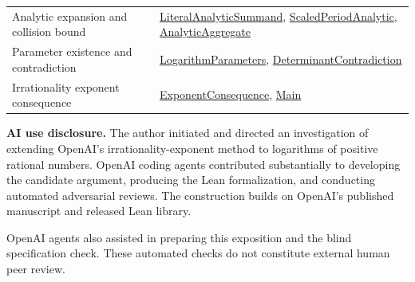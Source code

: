 \begin{longtable}{@{}>{\raggedright\arraybackslash}p{}>{\raggedright\arraybackslash}p{}@{}}
Analytic expansion and collision bound & \href{run:lean/Logarithm/LiteralAnalyticSummand.lean}{LiteralAnalyticSummand}, \href{run:lean/Logarithm/ScaledPeriodAnalytic.lean}{ScaledPeriodAnalytic}, \href{run:lean/Logarithm/AnalyticAggregate.lean}{AnalyticAggregate}\\[5pt]
Parameter existence and contradiction & \href{run:lean/Logarithm/LogarithmParameters.lean}{LogarithmParameters}, \href{run:lean/Logarithm/DeterminantContradiction.lean}{DeterminantContradiction}\\[5pt]
Irrationality exponent consequence & \href{run:lean/Logarithm/ExponentConsequence.lean}{ExponentConsequence}, \href{run:lean/Logarithm/Main.lean}{Main}\\[5pt]
\bottomrule
\end{longtable}
\normalsize

\textbf{AI use disclosure.} The author initiated and directed an investigation of extending OpenAI's irrationality-exponent method to logarithms of positive rational numbers. OpenAI coding agents contributed substantially to developing the candidate argument, producing the Lean formalization, and conducting automated adversarial reviews. The construction builds on OpenAI's published manuscript and released Lean library.

OpenAI agents also assisted in preparing this exposition and the blind specification check. These automated checks do not constitute external human peer review.
